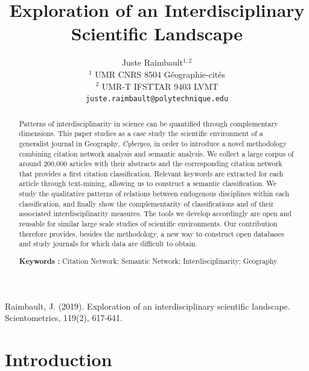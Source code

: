\documentclass[10pt]{article}
\begin{document}
\title{Exploration of an Interdisciplinary Scientific Landscape}

\author{Juste Raimbault$^{1,2}$\medskip\\
$^1$ UMR CNRS 8504 G{\'e}ographie-cit{\'e}s  \\
              $^2$ UMR-T IFSTTAR 9403 LVMT\medskip\\
\texttt{juste.raimbault@polytechnique.edu}
}

\date{}


Raimbault, J. (2019). Exploration of an interdisciplinary scientific landscape. Scientometrics, 119(2), 617-641.

{\let\newpage\relax\maketitle}

\begin{abstract}
Patterns of interdisciplinarity in science can be quantified through complementary dimensions. This paper studies as a case study the scientific environment of a generalist journal in Geography, \emph{Cybergeo}, in order to introduce a novel methodology combining citation network analysis and semantic analysis. We collect a large corpus of around 200,000 articles with their abstracts and the corresponding citation network that provides a first citation classification. Relevant keywords are extracted for each article through text-mining, allowing us to construct a semantic classification. We study the qualitative patterns of relations between endogenous disciplines within each classification, and finally show the complementarity of classifications and of their associated interdisciplinarity measures. The tools we develop accordingly are open and reusable for similar large scale studies of scientific environments. Our contribution therefore provides, besides the methodology, a new way to construct open databases and study journals for which data are difficult to obtain.
\medskip

\noindent\textbf{Keywords : } Citation Network; Semantic Network; Interdisciplinarity; Geography
\end{abstract}

\section*{Introduction}
\label{sec:intro}
\end{document}
